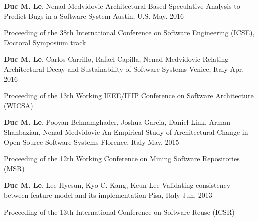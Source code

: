 \begin{cventries}
\cventry
{\textbf{Duc M. Le}, Nenad Medvidovic} %
{Architectural-Based Speculative Analysis to Predict Bugs in a Software System} %
{Austin, U.S.} %
{May. 2016} %
{
	\begin{cvitems} %
		\item Proceeding of the 38th International Conference on Software Engineering (ICSE), Doctoral Symposium track
	\end{cvitems}
}
	
\cventry
{\textbf{Duc M. Le}, Carlos Carrillo, Rafael Capilla, Nenad Medvidovic} %
{Relating Architectural Decay and Sustainability of Software Systems} %
{Venice, Italy} %
{Apr. 2016} %
{
	\begin{cvitems} %
		\item Proceeding of the 13th Working IEEE/IFIP Conference on Software Architecture (WICSA)
	\end{cvitems}
}


\cventry
{\textbf{Duc M. Le}, Pooyan Behnamghader, Joshua Garcia, Daniel	Link, Arman	Shahbazian, Nenad Medvidovic} %
{An Empirical Study of Architectural Change in Open-Source Software Systems} %
{Florence, Italy} %
{May. 2015} %
{
	\begin{cvitems} %
		\item Proceeding of the 12th Working Conference on Mining Software Repositories (MSR)
	\end{cvitems}
}

\cventry
{\textbf{Duc M. Le}, Lee Hyesun, Kyo C. Kang, Keun Lee } %
{Validating consistency between feature model and its implementation} %
{Pisa, Italy} %
{Jun. 2013} %
{
	\begin{cvitems} %
		\item Proceeding of the 13th International Conference on Software Reuse (ICSR)
	\end{cvitems}
}

\end{cventries}